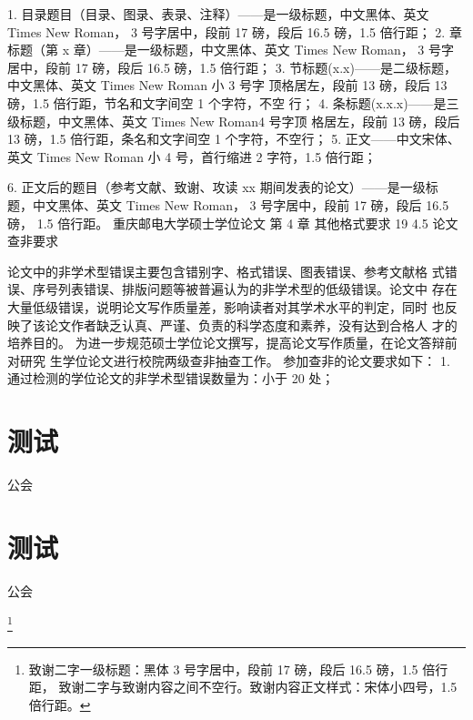 \documentclass{CQUPTThesis}
\begin{document}
1. 目录题目（目录、图录、表录、注释）——是一级标题，中文黑体、英文
Times New Roman， 3 号字居中，段前 17 磅，段后 16.5 磅，1.5 倍行距；
2. 章标题（第 x 章）——是一级标题，中文黑体、英文 Times New Roman， 3
号字居中，段前 17 磅，段后 16.5 磅，1.5 倍行距；
3. 节标题(x.x)——是二级标题，中文黑体、英文 Times New Roman 小 3 号字
顶格居左，段前 13 磅，段后 13 磅，1.5 倍行距，节名和文字间空 1 个字符，不空
行；
4. 条标题(x.x.x)——是三级标题，中文黑体、英文 Times New Roman4 号字顶
格居左，段前 13 磅，段后 13 磅，1.5 倍行距，条名和文字间空 1 个字符，不空行；
5. 正文——中文宋体、英文 Times New Roman 小 4 号，首行缩进 2 字符，1.5
倍行距；


6. 正文后的题目（参考文献、致谢、攻读 xx 期间发表的论文）——是一级标
题，中文黑体、英文 Times New Roman， 3 号字居中，段前 17 磅，段后 16.5 磅，
1.5 倍行距。
重庆邮电大学硕士学位论文 第 4 章 其他格式要求
19
4.5 论文查非要求

论文中的非学术型错误主要包含错别字、格式错误、图表错误、参考文献格
式错误、序号列表错误、排版问题等被普遍认为的非学术型的低级错误。论文中
存在大量低级错误，说明论文写作质量差，影响读者对其学术水平的判定，同时
也反映了该论文作者缺乏认真、严谨、负责的科学态度和素养，没有达到合格人
才的培养目的。
为进一步规范硕士学位论文撰写，提高论文写作质量，在论文答辩前对研究\cite{RN11,RN27,RN59}
生学位论文进行校院两级查非抽查工作\cite{王宏漫2003采用}。
参加查非的论文要求如下：
1. 通过检测的学位论文的非学术型错误数量为：小于 20 处；



\makebib



\makeappendix

\chapter{测试}
公会
\chapter{测试}
公会



\thanks{
	致谢二字一级标题：黑体 3 号字居中，段前 17 磅，段后 16.5 磅，1.5 倍行距，
致谢二字与致谢内容之间不空行。致谢内容正文样式：宋体小四号，1.5 倍行距。
}


\end{document}
